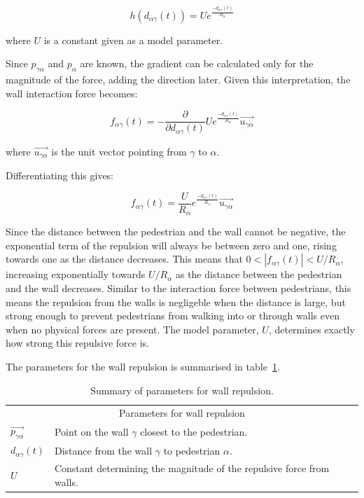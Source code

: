 \begin{equation}
    h \left( d_{\alpha \gamma}(t) \right) =
    U e^{\frac{- d_{\alpha \gamma}(t) }{ R_{\alpha} }}
\end{equation}

where $U$ is a constant given as a model parameter.

Since $p_{\gamma \alpha}$ and $p_\alpha$ are known, the gradient can be 
calculated only for the magnitude of the force, adding the direction later. 
Given this interpretation, the wall interaction force becomes:


\begin{equation}
    f_{\alpha \gamma}(t) =
    -\frac{\partial}{\partial d_{\alpha \gamma}(t)}U e^{\frac{- d_{\alpha 
    \gamma}(t) }{ R_{\alpha} }} \overrightarrow{u_{\gamma \alpha}}
\end{equation}

where $\overrightarrow{u_{\gamma \alpha}}$ is the unit vector pointing from 
$\gamma$ to $\alpha$.

Differentiating this gives: 

\begin{equation}
    f_{\alpha \gamma}(t) =
    \frac{U}{R_\alpha} 
    e^{\frac{- d_{\alpha \gamma}(t) }{ R_{\alpha} }}
    \overrightarrow{u_{\gamma \alpha}}
    \label{eqn:wall-repulsion}
\end{equation}

Since the distance between the pedestrian and the wall cannot be negative, the 
exponential term of the repulsion will always be between zero and one, rising 
towards one as the distance decreases. This means that $0 < |f_{\alpha 
\gamma}(t)| < U/R_\alpha$, increasing exponentially towards $U/R_\alpha$ as 
the distance between the pedestrian and the wall decreases. Similar to the 
interaction force between pedestrians, this means the repulsion from the walls 
is negligeble when the distance is large, but strong enough to prevent 
pedestrians from walking into or through walls even when no physical forces 
are present. The model parameter, $U$, determines exactly how strong this 
repulsive force is.

The parameters for the wall repulsion is summarised in 
table~\ref{tbl:wall-repulsion}.

\begin{table}[h]
    \centering
    \begin{tabular}{l l}
        \toprule
        \multicolumn{2}{c}{\textsf{Parameters for wall repulsion}}\\
        $\overrightarrow{p_{\gamma \alpha}}$ & Point on the wall $\gamma$ closest to 
        the pedestrian.\\
        $d_{\alpha \gamma}(t)$ & Distance from the wall $\gamma$ to pedestrian 
        $\alpha$. \\
        $U$ & Constant determining the magnitude of the repulsive force from 
        walls. \\
        \bottomrule
    \end{tabular}
    \caption{Summary of parameters for wall repulsion.}
    \label{tbl:wall-repulsion}
\end{table}

